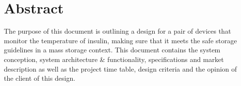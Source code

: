 \section*{Abstract}
The purpose of this document is outlining a design for a pair of devices that monitor the temperature of insulin, making sure that it meets the safe storage guidelines in a mass storage context. This document contains the system conception, system architecture \& functionality, specifications and market description as well as the project time table, design criteria and the opinion of the client of this design.

